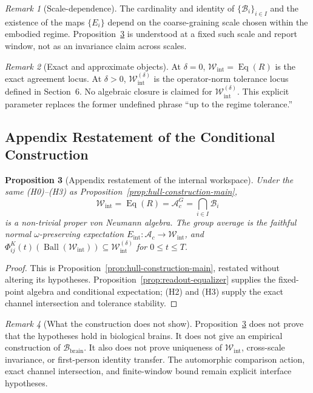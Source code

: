 \documentclass[12pt]{article}
\newtheorem{proposition}{Proposition}[section]
\theoremstyle{definition}
\theoremstyle{remark}
\newtheorem{remark}[proposition]{Remark}
\newcommand{\Ac}{\mathcal A_c}
\newcommand{\Bbrain}{\mathcal B_{\mathrm{brain}}}
\newcommand{\Wint}{\mathcal W_{\mathrm{int}}}
\begin{document}
\begin{remark}[Scale-dependence]
The cardinality and identity of \(\{\mathcal B_i\}_{i\in I}\) and the
existence of the maps \(\{E_i\}\) depend on the coarse-graining scale
chosen within the embodied regime.
Proposition~\ref{prop:conditional-construction} is understood at a fixed
such scale and report window, not as an invariance claim across scales.
\end{remark}

\begin{remark}[Exact and approximate objects]
At \(\delta=0\), \(\Wint=\operatorname{Eq}(R)\) is the exact agreement
locus. At \(\delta>0\), \(\Wint^{(\delta)}\) is the operator-norm
tolerance locus defined in Section~6. No algebraic closure is claimed
for \(\Wint^{(\delta)}\). This explicit parameter replaces the former
undefined phrase ``up to the regime tolerance.''
\end{remark}

\subsection{Appendix Restatement of the Conditional Construction}

\begin{proposition}[Appendix restatement of the internal workspace]
\label{prop:conditional-construction}
Under the same (H0)--(H3) as
Proposition~\ref{prop:hull-construction-main},
\[
\Wint
=\operatorname{Eq}(R)
=\Ac^G
=\bigcap_{i\in I}\mathcal B_i
\]
is a non-trivial proper von Neumann algebra. The group average is the
faithful normal \(\omega\)-preserving expectation
\(E_{\mathrm{int}}:\Ac\to\Wint\), and
\(\Phi_{ij}^{K}(t)(\operatorname{Ball}(\Wint))\subseteq
\Wint^{(\delta)}\) for \(0\leq t\leq T\).
\end{proposition}

\begin{proof}
This is Proposition~\ref{prop:hull-construction-main}, restated without
altering its hypotheses. Proposition~\ref{prop:readout-equalizer}
supplies the fixed-point algebra and conditional expectation; (H2) and
(H3) supply the exact channel intersection and tolerance stability.
\end{proof}

\begin{remark}[What the construction does not show]
Proposition~\ref{prop:conditional-construction} does not prove that
the hypotheses hold in biological brains. It does not give an empirical
construction of \(\Bbrain\). It also does not prove uniqueness of
\(\Wint\), cross-scale invariance, or first-person identity transfer.
The automorphic comparison action, exact channel intersection, and
finite-window bound remain explicit interface hypotheses.
\end{remark}
\end{document}

